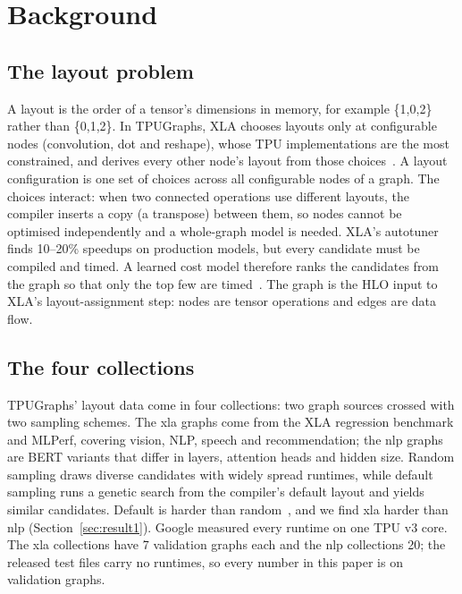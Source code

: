 \section{Background}
\label{sec:background}

\subsection{The layout problem}
\label{sec:layout-problem}
A layout is the order of a tensor's dimensions in memory, for example \{1,0,2\} rather than \{0,1,2\}.
In TPUGraphs, XLA chooses layouts only at configurable nodes (convolution, dot and reshape), whose TPU
implementations are the most constrained, and derives every other node's layout from those
choices~\cite{phothilimthana2023tpugraphs}. A layout configuration is one set of choices across all
configurable nodes of a graph. The choices interact: when two connected operations use different
layouts, the compiler inserts a copy (a transpose) between them, so nodes cannot be optimised
independently and a whole-graph model is needed. XLA's autotuner finds 10--20\% speedups on production
models, but every candidate must be compiled and timed. A learned cost model therefore ranks the
candidates from the graph so that only the top few are timed~\cite{kaufman2021learned}. The graph is
the HLO input to XLA's layout-assignment step: nodes are tensor operations and edges are data flow.

\subsection{The four collections}
\label{sec:collections}
TPUGraphs' layout data come in four collections: two graph sources crossed with two sampling schemes.
The xla graphs come from the XLA regression benchmark and MLPerf, covering vision, NLP, speech and
recommendation; the nlp graphs are BERT variants that differ in layers, attention heads and hidden
size. Random sampling draws diverse candidates with widely spread runtimes, while default sampling runs
a genetic search from the compiler's default layout and yields similar candidates. Default is harder
than random~\cite{phothilimthana2023tpugraphs}, and we find xla harder than nlp
(Section~\ref{sec:result1}). Google measured every runtime on one TPU v3 core. The xla collections have
7 validation graphs each and the nlp collections 20; the released test files carry no runtimes, so
every number in this paper is on validation graphs.

